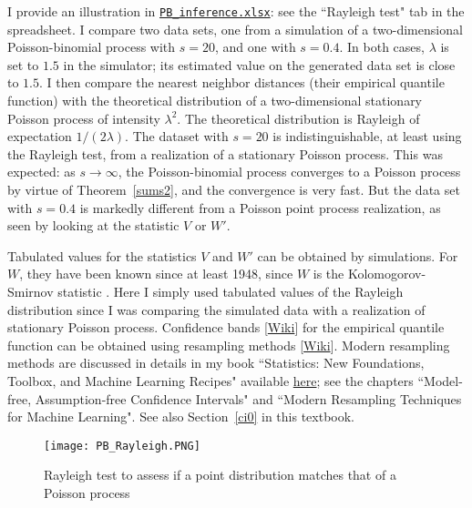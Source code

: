 \documentclass[10pt]{article}
\begin{document}
I provide an illustration in \href{https://github.com/VincentGranville/Point-Processes/tree/main/Spreadsheets}{\texttt{PB\_inference.xlsx}}:  see the ``Rayleigh test" tab in the spreadsheet. I compare two data sets, one from a simulation of a two-dimensional Poisson-binomial process
 with $s=20$, and one with $s=0.4$. In both cases, $\lambda$ is set to $1.5$ in the simulator; its estimated value on the generated data set is close to $1.5$. I then compare the \textcolor{index}{nearest neighbor distances} (their empirical quantile function) with the theoretical distribution of a two-dimensional stationary Poisson process of
intensity $\lambda^2$. The theoretical distribution is Rayleigh of expectation $1/(2\lambda)$. The dataset with $s=20$ is indistinguishable, at least using the Rayleigh test, from a realization of a stationary Poisson process. This was expected: as $s\rightarrow\infty$, the Poisson-binomial process converges to a Poisson process by virtue of Theorem~\ref{sums2}, and the convergence is very fast. But the data set with $s=0.4$ is markedly different from a Poisson point process realization, as seen by looking at the statistic $V$ or $W'$. 


Tabulated values for the statistics $V$ and $W'$ can be obtained by simulations. For $W$, they have been known since at least 1948, since $W$ is the
Kolomogorov-Smirnov statistic \cite{kst}. Here I simply used tabulated values of the Rayleigh distribution since I was comparing the simulated data with a realization of stationary Poisson process. 
\textcolor{index}{Confidence bands}  [\href{https://en.wikipedia.org/wiki/Confidence_and_prediction_bands}{Wiki}] for the
empirical quantile function can be obtained using \textcolor{index}{resampling} methods [\href{https://en.wikipedia.org/wiki/Resampling_(statistics)}{Wiki}].  Modern resampling methods are discussed in details in my book
``Statistics: New Foundations, Toolbox, and Machine Learning Recipes" \cite{vgstats} available 
\href{https://github.com/VincentGranville/Machine-Learning}{here}; see the chapters ``Model-free, Assumption-free Confidence Intervals" and
``Modern Resampling Techniques for Machine Learning". See also Section~\ref{ci0} in this textbook.


\begin{figure}%
\centering
\texttt{[image: PB\_Rayleigh.PNG]} 
\caption{Rayleigh test to assess if a point distribution matches that of a Poisson process}
\label{fig:rayleigh7}
\end{figure}
\end{document}
